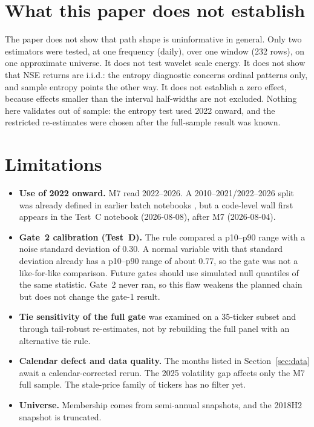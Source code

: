 \documentclass[11pt]{article}
\begin{document}
\section{What this paper does not establish}

The paper does not show that path shape is uninformative in general. Only two estimators
were tested, at one frequency (daily), over one window (232 rows), on one approximate
universe. It does not test wavelet scale energy. It does not show that NSE returns are
i.i.d.: the entropy diagnostic concerns ordinal patterns only, and sample entropy points
the other way. It does not establish a zero effect, because effects smaller than the
interval half-widths are not excluded. Nothing here validates out of sample: the entropy
test used 2022 onward, and the restricted re-estimates were chosen after the full-sample
result was known.

\section{Limitations}
\label{sec:limits}

\begin{itemize}
\item \textbf{Use of 2022 onward.} M7 read 2022--2026. A 2010--2021/2022--2026 split was
already defined in earlier batch notebooks \citep{sahi_momentum}, but a code-level wall
first appears in the Test~C notebook (2026-08-08), after M7 (2026-08-04).
\item \textbf{Gate~2 calibration (Test~D).} The rule compared a p10--p90 range with a noise
standard deviation of 0.30. A normal variable with that standard deviation already has a
p10--p90 range of about 0.77, so the gate was not a like-for-like comparison. Future gates
should use simulated null quantiles of the same statistic. Gate~2 never ran, so this flaw
weakens the planned chain but does not change the gate-1 result.
\item \textbf{Tie sensitivity of the full gate} was examined on a 35-ticker subset and
through tail-robust re-estimates, not by rebuilding the full panel with an alternative tie
rule.
\item \textbf{Calendar defect and data quality.} The months listed in Section~\ref{sec:data}
await a calendar-corrected rerun. The 2025 volatility gap affects only the M7 full sample.
The stale-price family of tickers has no filter yet.
\item \textbf{Universe.} Membership comes from semi-annual snapshots, and the 2018H2
snapshot is truncated.
\end{itemize}
\end{document}
